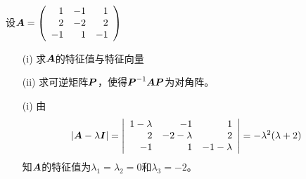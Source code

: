 \begin{frame}
  
  \begin{li}
    设$\boldsymbol{A}=\left(
      \begin{array}{rrr}
        1&-1&1\\
        2&-2&2\\
        -1&1&-1
      \end{array}
    \right)$
    \begin{itemize}
    \item[(i)]求$\boldsymbol{A}$的特征值与特征向量
    \item[(ii)] 求可逆矩阵$\boldsymbol{P}$，使得$\boldsymbol{P}^{-1}\boldsymbol{A}\boldsymbol{P}$为对角阵。 
    \end{itemize}
  \end{li}

  \begin{jie}
    \begin{itemize}
    \item[(i)]
      由
      $$
      \begin{aligned}
        |\boldsymbol{A}-\lambda\boldsymbol{I}|
        &=\left|
          \begin{array}{rrr}
            1-\lambda&-1&1\\
            2&-2-\lambda&2\\
            -1&1&-1-\lambda
          \end{array}
        \right|=-\lambda^2(\lambda+2)
        \end{aligned}
        $$
        知$\boldsymbol{A}$的特征值为$\lambda_1=\lambda_2=0$和$\lambda_3=-2$。
    \end{itemize}
  \end{jie}
  
\end{frame}

